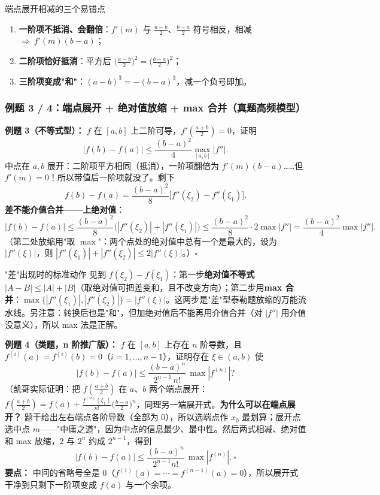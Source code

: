\documentclass[a4paper]{article}
\begin{document}
\begin{warningbox}{端点展开相减的三个易错点}
\begin{enumerate}
\item \textbf{一阶项不抵消、会翻倍}：$f'(m)$ 与 $\frac{a-b}{2}$、$\frac{b-a}{2}$ 符号相反，相减 $\Rightarrow\ f'(m)(b-a)$；
\item \textbf{二阶项恰好抵消}：平方后 $\Big(\frac{a-b}{2}\Big)^2=\Big(\frac{b-a}{2}\Big)^2$；
\item \textbf{三阶项变成"和"}：$(a-b)^3=-(b-a)^3$，减一个负号即加。
\end{enumerate}
\end{warningbox}

\subsubsection{例题 3 / 4：端点展开 + 绝对值放缩 + max 合并（真题高频模型）}

\textbf{例题 3（不等式型）：} $f$ 在 $[a,b]$ 上二阶可导，$f'(\frac{a+b}{2})=0$，证明
\[
|f(b)-f(a)|\le \frac{(b-a)^2}{4}\max_{[a,b]}|f''| .
\]
中点在 $a,b$ 展开：二阶项平方相同（抵消），一阶项翻倍为 $f'(m)(b-a)$……但 $f'(m)=0$！所以带值后一阶项就没了。剩下
\[
f(b)-f(a)=\frac{(b-a)^2}{8}\big[f''(\xi_2)-f''(\xi_1)\big].
\]
\textbf{差不能介值合并——上绝对值}：
\[
|f(b)-f(a)|\le\frac{(b-a)^2}{8}\big(|f''(\xi_2)|+|f''(\xi_1)|\big)\le\frac{(b-a)^2}{8}\cdot 2\max|f''|=\frac{(b-a)^2}{4}\max|f''|.
\]
（第二处放缩用"取 $\max$"：两个点处的绝对值中总有一个是最大的，设为 $|f''(\xi)|$，则 $|f''(\xi_1)|+|f''(\xi_2)|\le 2|f''(\xi)|$。）$\square$

\begin{warningbox}{"差"出现时的标准动作}
见到 $f(\xi_2)-f(\xi_1)$：第一步\textbf{绝对值不等式} $|A-B|\le|A|+|B|$（取绝对值可把差变和，且不改变方向）；第二步用\textbf{max 合并}：$\max\{|f''(\xi_1)|,|f''(\xi_2)|\}=|f''(\xi)|$。这两步是"差"型泰勒题放缩的万能流水线。另注意：转换后也是"和"，但加绝对值后不能再用介值合并（对 $|f''|$ 用介值没意义），所以 max 法是正解。
\end{warningbox}

\textbf{例题 4（类题，n 阶推广版）：} $f$ 在 $[a,b]$ 上存在 $n$ 阶导数，且 $f^{(i)}(a)=f^{(i)}(b)=0$（$i=1,\ldots,n-1$），证明存在 $\xi\in(a,b)$ 使
\[
|f(b)-f(a)|\le\frac{(b-a)^n}{2^{n-1}\,n!}\,\max|f^{(n)}| ?
\]
（凯哥实际证明：把 $f(\tfrac{a+b}{2})$ 在 $a$、$b$ 两个端点展开：$f(\tfrac{a+b}{2})=f(a)+\frac{f^{(n)}(\xi_1)}{n!}\Big(\frac{b-a}{2}\Big)^n$，同理另一端展开式。\textbf{为什么可以在端点展开？} 题干给出左右端点各阶导数（全部为 0），所以选端点作 $x_0$ 最划算；展开点选中点 $m$——"中庸之道"，因为中点的信息最少、最中性。然后两式相减、绝对值和 max 放缩，$2$ 与 $2^n$ 约成 $2^{n-1}$，得到
\[
|f(b)-f(a)|\le\frac{(b-a)^n}{2^{n-1}n!}\,\max|f^{(n)}|.\ \square
\]
\textbf{要点：} 中间的省略号全是 0（$f^{(1)}(a)=\cdots=f^{(n-1)}(a)=0$），所以展开式干净到只剩下一阶项变成 $f(a)$ 与一个余项。
\end{document}
